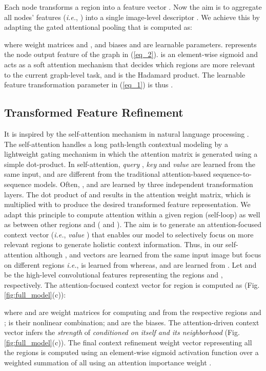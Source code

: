 \documentclass[journal]{IEEEtran}
\begin{document}
Each node transforms a region into a feature vector . Now the aim is to aggregate all nodes' features (\textit{i.e.}, ) into a single image-level descriptor . We achieve this by adapting the gated attentional pooling \cite{li2016gated} that is computed as:\vspace{-.12cm}

where weight matrices  and , and biases  and  are learnable parameters.  represents the  node output feature of the graph  in (\ref{eq_2}).  is an element-wise sigmoid and acts as a soft attention mechanism that decides which regions are more relevant to the current graph-level task, and  is the Hadamard product. The learnable feature transformation parameter in (\ref{eq_1}) is thus . 
\subsection{Transformed Feature Refinement}\label{sec:cotext}
It is inspired by the self-attention mechanism in natural language processing \cite{vaswani2017attention}. The self-attention handles a long path-length contextual modeling by a lightweight gating mechanism in which the attention matrix is generated using a simple dot-product. In self-attention, \textit{query} , \textit{key}  and \textit{value}  are learned from the same input, and are different from the traditional attention-based sequence-to-sequence models. Often, ,  and  are learned by three independent transformation layers. The dot product of  and  results in the attention weight matrix, which is multiplied with  to produce the desired transformed feature representation. We adapt this principle to compute attention within a given region  (self-loop) as well as between other regions  and  ( and ). The aim is to generate an attention-focused context vector (\textit{i.e.}, \textit{value} ) that enables our model to selectively focus on more relevant regions to generate holistic context information. Thus, in our self-attention although ,  and  vectors are learned from the same input image but focus on different regions \textit{i.e.},  is learned from  whereas,  and  are learned from . Let  and  be the high-level convolutional features representing the regions  and , respectively. The attention-focused context vector  for region  is computed as (Fig. \ref{fig:full_model}(c)):\vspace{-.07cm}

where  and  are weight matrices for computing  and  from the respective regions  and  ;   is their nonlinear combination;  and  are the biases. The attention-driven context vector  infers the \textit{strength} of  \textit{conditioned on itself and its neighborhood} (Fig. \ref{fig:full_model}(c)). The final context refinement weight vector  representing all the regions  is computed using an element-wise sigmoid activation function  over a weighted summation of all  using an attention importance weight . 
\end{document}

